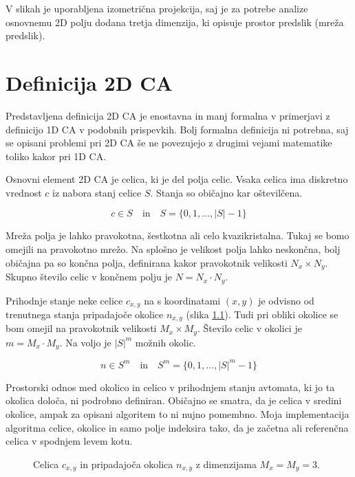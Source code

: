 \documentclass[12pt,a4paper,openany,twoside]{book}
\begin{document}
V slikah je uporabljena izometrična projekcija,
saj je za potrebe analize osnovnemu 2D polju dodana tretja dimenzija,
ki opisuje prostor predslik (mreža predslik).

\chapter{Definicija 2D CA}

Predstavljena definicija 2D CA je enostavna in manj formalna
v primerjavi z definicijo 1D CA v podobnih prispevkih.
Bolj formalna definicija ni potrebna, saj se opisani problemi pri 2D CA
še ne povezujejo z drugimi vejami matematike toliko kakor pri 1D CA.

Osnovni element 2D CA je celica, ki je del polja celic.
Vsaka celica ima diskretno vrednost \(c\) iz nabora stanj celice \(S\).
Stanja so običajno kar oštevilčena.

\begin{equation}
c \in S
\quad \textrm{in} \quad
S = \{ 0, 1, \dots, {\lvert S \rvert} -1 \}
\end{equation}

Mreža polja je lahko pravokotna, šestkotna ali celo kvazikristalna. Tukaj se
bomo omejili na pravokotno mrežo. Na splošno je velikost polja lahko neskončna,
bolj običajna pa so končna polja, definirana kakor pravokotnik velikosti \(N_x \times N_y\).
Skupno število celic v končnem polju je \(N=N_x \cdot N_y\).

Prihodnje stanje neke celice \(c_{x,y}\) na s koordinatami \((x,y)\)
je odvisno od trenutnega stanja pripadajoče okolice \(n_{x,y}\) (slika \ref{neighborhood}).
Tudi pri obliki okolice se bom omejil na pravokotnik velikosti \(M_x \times M_y\).
Število celic v okolici je \(m=M_x \cdot M_y\).
Na voljo je \({\lvert S \rvert}^m\) možnih okolic.

\begin{equation}
n \in S^m
\quad \textrm{in} \quad
S^m = \{ 0, 1, \dots, {\lvert S \rvert}^m -1 \}
\end{equation}

Prostorski odnos med okolico in celico v prihodnjem stanju avtomata, ki jo ta okolica določa,
ni podrobno definiran. Običajno se smatra, da je celica v sredini okolice, ampak za opisani algoritem to ni
nujno pomembno. Moja implementacija algoritma celice, okolice in samo polje indeksira tako,
da je začetna ali referenčna celica v spodnjem levem kotu.

\begin{figure}[htb]
\centerline{}
\caption[Velikost okolice.]{Celica \(c_{x,y}\) in pripadajoča okolica \(n_{x,y}\) z dimenzijama \(M_x=M_y=3\).}
\label{neighborhood}
\end{figure}
\end{document}
